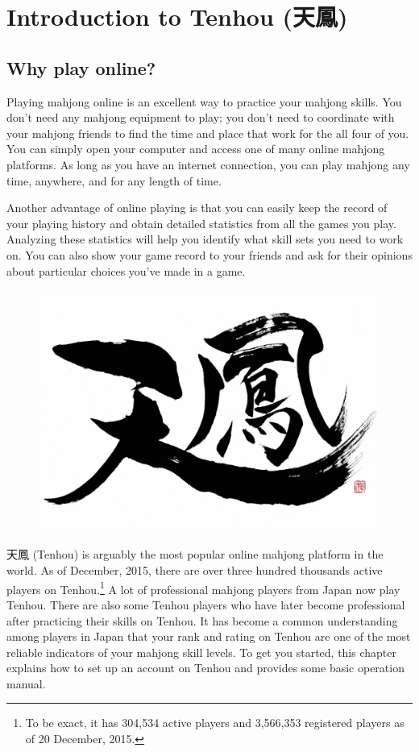 
\chapter{Introduction to {\jap Tenhou} (天鳳)} \label{ch:Tenhou}
\thispagestyle{empty}

\section{Why play online?}

Playing mahjong online is an excellent way to practice your mahjong skills. You don't need any mahjong equipment to play; you don't need to coordinate with your mahjong friends to find the time and place that work for the all four of you. You can simply open your computer and access one of many online mahjong platforms. As long as you have an internet connection, you can play mahjong any time, anywhere, and for any length of time. 

\bigskip
Another advantage of online playing is that you can easily keep the record of your playing history and obtain detailed statistics from all the games you play. Analyzing these statistics will help you identify what skill sets you need to work on. You can also show your game record to your friends and ask for their opinions about particular choices you've made in a game. 

\begin{figure}
\vspace{-20pt}
\begin{center}
\includegraphics[width=.43\textwidth,clip]{figs/Tenhou_logo_raw_wb}
\end{center}
\vspace{-20pt}
\end{figure}

\bigskip

天鳳 ({\jap Tenhou}) is arguably the most popular online mahjong platform in the world. As of December, 2015, there are over three hundred thousands active players on {\jap Tenhou}.\footnote{To be exact, it has 304,534 active players and 3,566,353 registered players as of 20 December, 2015.} A lot of professional mahjong players from Japan now play {\jap Tenhou}. There are also some {\jap Tenhou} players who have later become professional after practicing their skills on {\jap Tenhou}. It has become a common understanding among players in Japan that your rank and rating on {\jap Tenhou} are one of the most reliable indicators of your mahjong skill levels. 
To get you started, this chapter explains how to set up an account on {\jap Tenhou} and provides some basic operation manual. 

